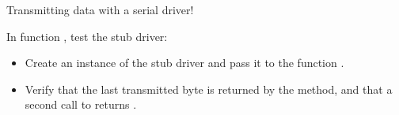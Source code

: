 \begin{console}
Transmitting data with a serial driver!
\end{console}

In function , test the stub driver:
\begin{itemize}
  \item Create an instance of the stub driver and pass it to the function .
  \item Verify that the last transmitted byte \code{!} is returned by the  method,
    and that a second call to  returns .
\end{itemize}
